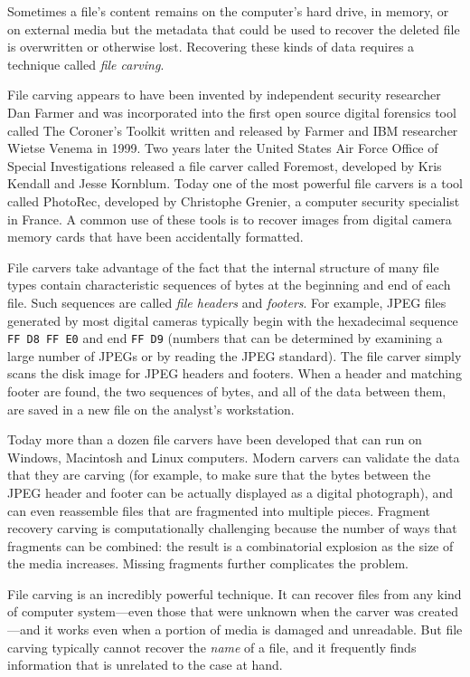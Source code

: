 \documentclass[11pt,letter]{article}
\begin{document}
Sometimes a file's content remains on the computer's hard
drive, in memory, or on external media but the metadata that could be
used to recover the deleted file is overwritten or otherwise lost. Recovering
these kinds of data requires a technique called \emph{file carving}.

File carving appears to have been invented by independent security researcher
Dan Farmer and was incorporated into the first open source digital
forensics tool called The Coroner's Toolkit written and released by Farmer and IBM
researcher Wietse Venema in 1999. Two years later 
the United
States Air Force Office of Special Investigations released a file carver called Foremost, developed by Kris Kendall and
Jesse Kornblum. Today one of the most powerful file carvers is 
a tool called PhotoRec, developed by Christophe Grenier, a computer
security specialist in France. A common use
of these tools is to recover images from digital camera memory cards
that have been accidentally formatted.

File carvers take advantage of the fact that the internal structure of
many file types contain
characteristic sequences of bytes at the beginning and
end  of each file. Such sequences are called \emph{file headers} and
\emph{footers}. For example, JPEG files generated by
most digital cameras typically begin with the hexadecimal sequence \texttt{FF D8 FF E0} and end
\texttt{FF D9}  (numbers that can be determined by examining a large
number of JPEGs or by reading the JPEG standard). The file carver simply scans the disk image for JPEG
headers and footers. When a header and matching footer are found, the
two sequences of bytes, and all of the data between them, are saved in
a new file on the analyst's workstation.

Today more than a dozen file carvers have been developed that can
run on Windows, Macintosh and Linux computers. Modern carvers can
validate the data that they are carving (for example, to make sure
that the bytes between the JPEG header and footer can be actually
displayed as a digital photograph), and can even reassemble files that are fragmented
into multiple pieces\citep{pal-sht}. Fragment recovery carving is
computationally challenging because the number of ways that fragments
can be combined: the result is a combinatorial explosion as the size of
the media increases. Missing fragments further complicates the problem.

File carving is an incredibly powerful technique. It can recover files
from any kind of computer system---even those that were unknown when
the carver was created---and it works even when a portion of media is
damaged and unreadable. But file carving typically cannot recover the
\emph{name} of a file, and it frequently finds information that is
unrelated to the case at hand.
\end{document}
